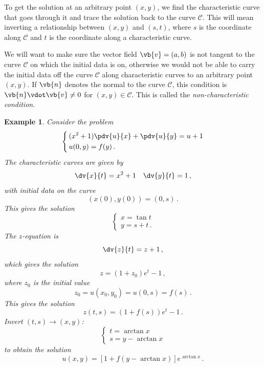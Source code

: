 \documentclass{article}
\theoremstyle{plain}\theoremheaderfont{\normalfont\itshape}\theorembodyfont{\rmfamily}\theoremseparator{.}\newtheorem*{rem}{Remark}\newtheorem*{ex}{Example}\newtheorem*{proof}{Proof}\newtheorem*{altp}{Alternative proof}
\theoremstyle{plain}\theoremheaderfont{\normalfont\bfseries}\theorembodyfont{\rmfamily}\theoremseparator{.}\newtheorem{thm}{Theorem}[section]\newtheorem{lem}[thm]{Lemma}\newtheorem{prop}[thm]{Proposition}\newtheorem*{cor}{Corollary}\newtheorem{defn}[thm]{Definition}\newtheorem{clm}[thm]{Claim}\newtheorem{clminproof}{Claim}
\theoremstyle{break}\theoremheaderfont{\normalfont\itshape}\theorembodyfont{\rmfamily}\theoremseparator{.\medskip}\newtheorem*{proofskip}{Proof}\newtheorem*{exs}{Examples}\newtheorem*{rems}{Remarks}
\theoremstyle{break}\theoremheaderfont{\normalfont\bfseries}\theorembodyfont{\rmfamily}\theoremseparator{.\medskip}\newtheorem{lemskip}[thm]{Lemma}\newtheorem{defnskip}[thm]{Definition}\newtheorem{propskip}[thm]{Proposition}\newtheorem{thmskip}[thm]{Theorem}
\numberwithin{equation}{section}
\begin{document}
	To get the solution at an arbitrary point \((x, y)\), we find the characteristic curve that goes through it and trace the solution back to the curve \(\mathcal{C}\). This will mean inverting a relationship between \((x, y)\) and \((s, t)\), where \(s\) is the coordinate along \(\mathcal{C}\) and \(t\) is the coordinate along a characteristic curve.

	We will want to make sure the vector field \(\vb{v}=(a, b)\) is not tangent to the curve \(\mathcal{C}\) on which the initial data is on, otherwise we would not be able to carry the initial data off the curve \(\mathcal{C}\) along characteristic curves to an arbitrary point \((x, y)\). If \(\vb{n}\) denotes the normal to the curve \(\mathcal{C}\), this condition is \(\vb{n}\vdot\vb{v}\ne 0\) for \((x, y)\in\mathcal{C}\). This is called the \textit{non-characteristic condition}.

	\begin{ex}
		Consider the problem
		\[\left\{\begin{aligned}
			\,&(x^2+1)\pdv{u}{x}+\pdv{u}{y}=u+1\\
			\,&u(0,y)=f(y)\,.
		\end{aligned}\right.\]
		The characteristic curves are given by
		\[\dv{x}{t}=x^2+1\quad\dv{y}{t}=1\,,\]
		with initial data on the curve
		\[(x(0),y(0))=(0,s)\,.\]
		This gives the solution
		\[\begin{cases}
			x=\tan t\\
			y=s+t\,.
		\end{cases}\]
		The \(z\)-equation is
		\[\dv{z}{t}=z+1\,,\]
		which gives the solution
		\[z=(1+z_0)e^t-1\,,\]
		where \(z_0\) is the initial value
		\[z_0=u(x_0,y_0)=u(0,s)=f(s)\,.\]
		This gives the solution
		\[z(t,s)=(1+f(s))e^t-1\,.\]
		Invert \((t,s)\rightarrow(x,y)\):
		\[\begin{cases}
			t=\arctan x\\
			s=y-\arctan x
		\end{cases}\]
		to obtain the solution
		\[u(x,y)=[1+f(y-\arctan x)]e^{\arctan x}\,.\]
	\end{ex}
\end{document}
